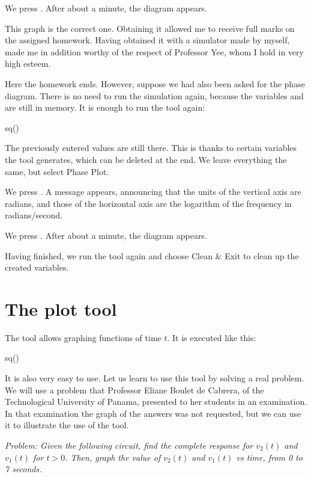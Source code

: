 We press . After about a minute, the diagram appears.

This graph is the correct one. Obtaining it allowed me to receive
full marks on the assigned homework. Having obtained it with a
simulator made by myself, made me in addition worthy of the respect
of Professor Yee, whom I hold in very high esteem.

Here the homework ends. However, suppose we had also been asked for
the phase diagram. There is no need to run the simulation again,
because the variables  and  are still in memory.
It is enough to run the  tool again:

\begin{entry}
sq\bode()
\end{entry}

The previously entered values are still there. This is thanks to
certain variables the tool generates, which can be deleted at the
end. We leave everything the same, but select Phase Plot.

We press . A message appears, announcing that the units
of the vertical axis are radians, and those of the horizontal axis
are the logarithm of the frequency in radians/second.

We press . After about a minute, the diagram appears.

Having finished, we run the tool again and choose Clean \& Exit to
clean up the created variables.

\section{The plot tool}

The  tool allows graphing functions of time $t$. It is
executed like this:

\begin{entry}
sq\plot()
\end{entry}

It is also very easy to use. Let us learn to use this tool by
solving a real problem. We will use a problem that Professor Eliane
Boulet de Cabrera, of the Technological University of Panama,
presented to her students in an examination. In that examination the
graph of the answers was not requested, but we can use it to
illustrate the use of the tool.


\emph{Problem: Given the following circuit, find the complete
response for $v_2(t)$ and $v_1(t)$ for $t > 0$. Then, graph the
value of $v_2(t)$ and $v_1(t)$ vs time, from 0 to 7 seconds.}


